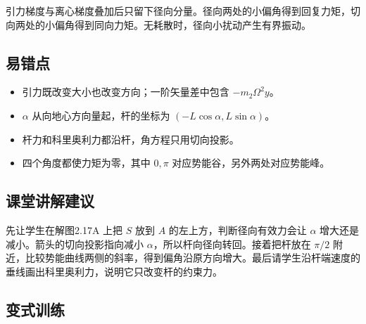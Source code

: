 \documentclass[UTF8,fontset=fandol,a4paper,11pt]{ctexart}
\begin{document}
引力梯度与离心梯度叠加后只留下径向分量。径向两处的小偏角得到回复力矩，切向两处的小偏角得到同向力矩。无耗散时，径向小扰动产生有界振动。



\subsection*{易错点}

\begin{itemize}
\item 引力既改变大小也改变方向；一阶矢量差中包含 $-m_2\Omega^2y$。
\item $\alpha$ 从向地心方向量起，杆的坐标为 $(-L\cos\alpha,L\sin\alpha)$。
\item 杆力和科里奥利力都沿杆，角方程只用切向投影。
\item 四个角度都使力矩为零，其中 $0,\pi$ 对应势能谷，另外两处对应势能峰。
\end{itemize}



\subsection*{课堂讲解建议}

先让学生在解图2.17A 上把 $S$ 放到 $A$ 的左上方，判断径向有效力会让 $\alpha$ 增大还是减小。箭头的切向投影指向减小 $\alpha$，所以杆向径向转回。接着把杆放在 $\pi/2$ 附近，比较势能曲线两侧的斜率，得到偏角沿原方向增大。最后请学生沿杆端速度的垂线画出科里奥利力，说明它只改变杆的约束力。



\subsection*{变式训练}
\end{document}
